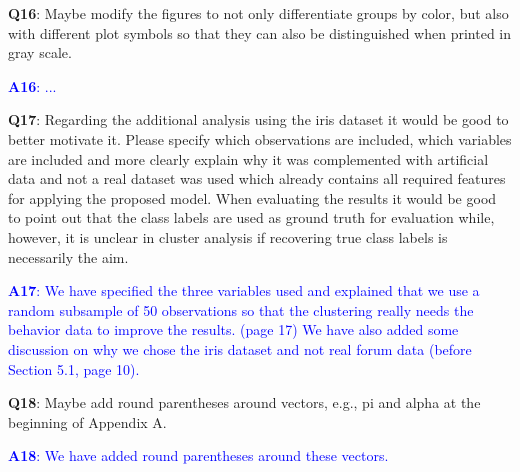 \documentclass[]{article}
\begin{document}
	
	\vspace{3mm}
	\textbf{Q16}:  Maybe modify the figures to not only differentiate groups by color, but also with different plot symbols so that they can also be distinguished when printed in gray scale.

	\textcolor{blue}{  
	\textbf{A16}: ...
	} 

	
	\vspace{3mm}
	\textbf{Q17}: Regarding the additional analysis using the iris dataset it would be good to better motivate it. Please specify which observations are included, which variables are included and more clearly explain why it was complemented with artificial data and not a real dataset was used which already contains all required features for applying the proposed model. When evaluating the results it would be good to point out that the class labels are used as ground truth for evaluation while, however, it is unclear in cluster analysis if recovering true class labels is necessarily the aim.

	\textcolor{blue}{  
	\textbf{A17}:  We have specified the three variables used and explained that we use a random subsample of 50 observations so that the clustering really needs the behavior data to improve the results.  (page 17) We have also added some discussion on why we chose the iris dataset and not real forum data (before Section 5.1, page 10).
	} 
	
	\vspace{3mm}
	\textbf{Q18}: Maybe add round parentheses around vectors, e.g., pi and alpha at the beginning of Appendix A.
	
	\textcolor{blue}{  
	\textbf{A18}: We have added round parentheses around these vectors.
	} 
	
\end{document}
